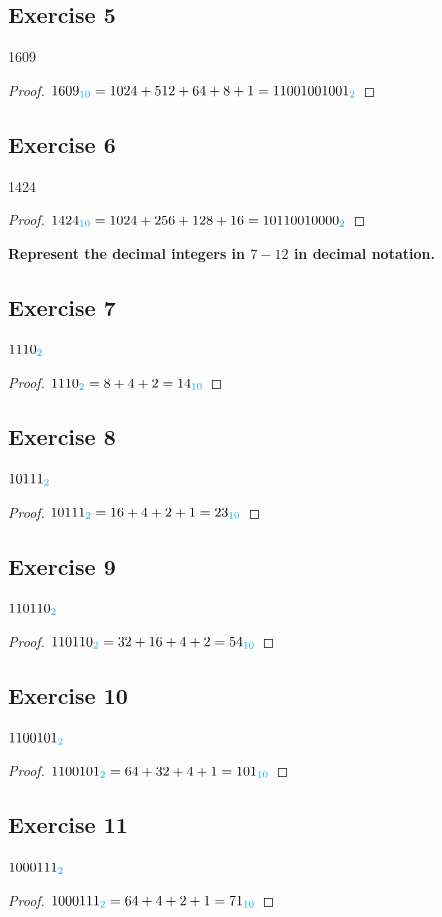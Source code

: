 \documentclass[14pt]{extarticle}
\newcommand{\base}[1]{{\color{cyan}#1}} \newcommand{\da}{\downarrow}
\begin{document}
\subsection{Exercise 5} 1609
\begin{proof} $1609_\base{10} = 1024 + 512 + 64 + 8 + 1 = 11001001001_\base{2}$
\end{proof}

\subsection{Exercise 6} 1424
\begin{proof} $1424_\base{10} = 1024 + 256 + 128 + 16 = 10110010000_\base{2}$
\end{proof}

{\bf \color{cyan} Represent the decimal integers in $7-12$ in decimal notation.}
\subsection{Exercise 7} $1110_\base{2}$
\begin{proof} $1110_\base{2} = 8 + 4 + 2 = 14_\base{10}$ \end{proof}
\subsection{Exercise 8} $10111_\base{2}$
\begin{proof} $10111_\base{2} = 16 + 4 + 2 + 1 = 23_\base{10}$ \end{proof}
\subsection{Exercise 9} $110110_\base{2}$
\begin{proof} $110110_\base{2} = 32 + 16 + 4 + 2 = 54_\base{10}$ \end{proof}
\subsection{Exercise 10} $1100101_\base{2}$
\begin{proof} $1100101_\base{2} = 64 + 32 + 4 + 1 = 101_\base{10}$ \end{proof}
\subsection{Exercise 11} $1000111_\base{2}$
\begin{proof} $1000111_\base{2} = 64 + 4 + 2 + 1 = 71_\base{10}$ \end{proof}
\end{document}
